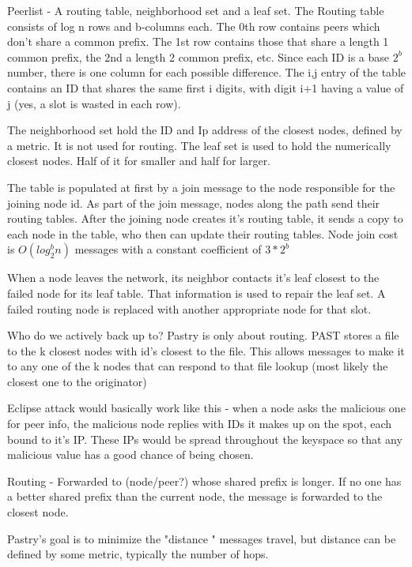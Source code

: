 \documentclass[10pt,letterpaper]{report}
\begin{document}
Peerlist  -   A routing table, neighborhood set and a leaf set.  The Routing table consists of log n rows and  b-columns each.  The 0th row contains peers which don't share a common prefix.  The 1st row contains those that share a length 1 common prefix, the 2nd a length 2 common prefix, etc.  Since each ID is a base $2^b$ number, there is one column for each possible difference.   The i,j entry of the table contains an ID that shares the same first i digits, with digit i+1 having a value of j (yes, a slot is wasted in each row).

The neighborhood set hold the ID and Ip address of the closest nodes, defined by a metric.  It is not used for routing.  The leaf set is used to hold the numerically closest nodes. Half of it for smaller and half for larger.

The table is populated at first by a join message to the node responsible for the joining node id.  As part of the join message, nodes  along the path send their routing tables.  After the joining node creates it's routing table, it sends a copy to each node in the table, who then can update their routing tables.   Node join cost is $O(log_2^b n)$ messages  with  a constant  coefficient  of $3*2^b$

When a node leaves the network, its neighbor contacts it's leaf closest to the failed node  for its leaf table.  That information is used to repair the leaf set.  A failed routing node is replaced with another appropriate node for that slot.  


Who do we actively back up to? Pastry is only about routing. PAST stores a file  to the k closest nodes with id's closest to the file.  This allows messages to make it to any one of the k nodes that can respond to that file lookup (most likely the closest one to the originator)

Eclipse attack would basically work like this -  when a node asks the malicious one for peer info, the malicious node replies with IDs it makes up on the spot, each bound to it's IP. These IPs would be spread throughout the keyspace so that any malicious value has a good chance of being chosen.

Routing - Forwarded to (node/peer?) whose shared prefix is longer.  If no one  has a better shared prefix than the current node, the message is forwarded to the closest  node.

Pastry's goal is to minimize the "distance " messages travel, but distance can be defined by some metric, typically the number of hops.
\end{document}
